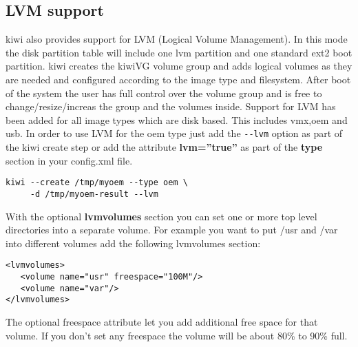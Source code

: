 \subsection{LVM support}

kiwi also provides support for LVM (Logical Volume Management). In this
mode the disk partition table will include one lvm partition and one
standard ext2 boot partition. kiwi creates the kiwiVG volume group and
adds logical volumes as they are needed and configured according to the
image type and filesystem. After boot of the system the user has full
control over the volume group and is free to change/resize/increas the
group and the volumes inside. Support for LVM has been added for all
image types which are disk based. This includes vmx,oem and usb.
In order to use LVM for the oem type just add the \verb+--lvm+ option
as part of the kiwi create step or add the attribute \textbf{lvm=''true''}
as part of the \textbf{type} section in your config.xml file.

\begin{Command}{12cm}
\begin{verbatim}
kiwi --create /tmp/myoem --type oem \
     -d /tmp/myoem-result --lvm
\end{verbatim}
\end{Command}

With the optional \textbf{lvmvolumes} section you can set one or
more top level directories into a separate volume. For example you
want to put /usr and /var into different volumes add the following
lvmvolumes section:

\begin{Command}{12cm}
\begin{verbatim}
<lvmvolumes>
   <volume name="usr" freespace="100M"/>
   <volume name="var"/>
</lvmvolumes>
\end{verbatim}
\end{Command}

The optional freespace attribute let you add additional free space
for that volume. If you don't set any freespace the volume will be
about 80\% to 90\% full.
